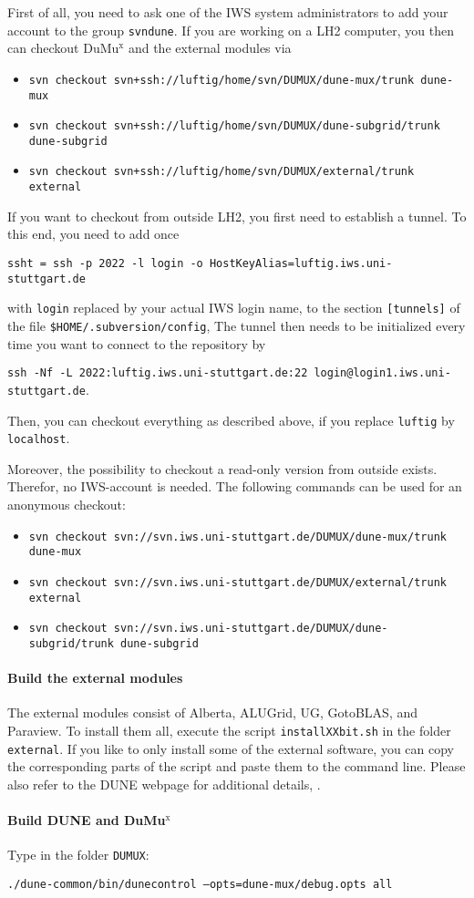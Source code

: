 First of all, you need to ask one of the IWS system administrators to 
add your account to the group \texttt{svndune}. 
If you are working on a LH2 computer, you then can checkout DuMu$^\text{x}$ 
and the external modules via 
\begin{itemize}
\item \texttt{svn checkout svn+ssh://luftig/home/svn/DUMUX/dune-mux/trunk dune-mux}
\item \texttt{svn checkout svn+ssh://luftig/home/svn/DUMUX/dune-subgrid/trunk dune-subgrid}
\item \texttt{svn checkout svn+ssh://luftig/home/svn/DUMUX/external/trunk external}
\end{itemize} 
If you want to checkout from outside LH2, you first need to establish a tunnel. 
To this end, you need to add once 
\begin{center}
\texttt{ssht = ssh -p 2022 -l login -o HostKeyAlias=luftig.iws.uni-stuttgart.de} 
\end{center}
with \texttt{login} replaced 
by your actual IWS login name, to the section \texttt{[tunnels]} of the 
file \texttt{\$HOME/.subversion/config}, 
The tunnel then needs to be initialized every time you want 
to connect to the repository by 
\begin{center}
\texttt{ssh -Nf -L 2022:luftig.iws.uni-stuttgart.de:22 login@login1.iws.uni-stuttgart.de}.
\end{center}
Then, you can checkout everything as described above, if you replace \texttt{luftig} 
by \texttt{localhost}. 

Moreover, the possibility to checkout a read-only version from outside exists. Therefor, no IWS-account is needed. The following commands can be used for an anonymous checkout:
\begin{itemize}
\item \texttt{svn checkout svn://svn.iws.uni-stuttgart.de/DUMUX/dune-mux/trunk dune-mux}
\item \texttt{svn checkout svn://svn.iws.uni-stuttgart.de/DUMUX/external/trunk external}
\item \texttt{svn checkout svn://svn.iws.uni-stuttgart.de/DUMUX/dune-subgrid/trunk dune-subgrid}
\end{itemize} 

\paragraph{Build the external modules} 
The external modules consist of Alberta, ALUGrid, UG, GotoBLAS, and Paraview. 
To install them all, execute the script \texttt{installXXbit.sh} in the folder \texttt{external}. 
If you like to only install some of the external software, you can copy the corresponding 
parts of the script and paste them to the command line. 
Please also refer to the DUNE webpage for additional details, \cite{DUNE-HP}. 

\paragraph{Build DUNE and DuMu$^\text{x}$}
Type in the folder \texttt{DUMUX}: 
\begin{center}
\texttt{./dune-common/bin/dunecontrol --opts=dune-mux/debug.opts all}
\end{center}

